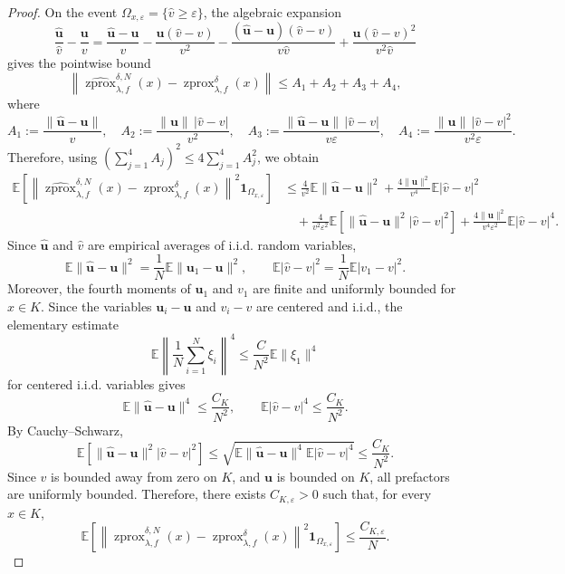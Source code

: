 \documentclass{article}
\newcommand{\zprox}{\ensuremath{\operatorname{zprox}}}
\newcommand{\szprox}{\ensuremath{\widehat{\operatorname{zprox}}}}
\begin{document}
\begin{proof}
On the event \(\Omega_{x,\varepsilon}=\{\hat v\ge \varepsilon\}\), the algebraic expansion
\[
\frac{\hat{\mathbf u}}{\hat v}-\frac{\mathbf u}{v}
=
\frac{\hat{\mathbf u}-\mathbf u}{v}
-
\frac{\mathbf u(\hat v-v)}{v^2}
-
\frac{(\hat{\mathbf u}-\mathbf u)(\hat v-v)}{v\hat v}
+
\frac{\mathbf u(\hat v-v)^2}{v^2\hat v}
\]
gives the pointwise bound
\[
\left\|
\szprox_{\lambda,f}^{\delta,N}(x)
-
\zprox_{\lambda,f}^{\delta}(x)
\right\|
\le A_1+A_2+A_3+A_4,
\]
where
\[
A_1:=\frac{\|\hat{\mathbf u}-\mathbf u\|}{v},
\quad
A_2:=\frac{\|\mathbf u\|\,|\hat v-v|}{v^2}, \quad A_3:=
\frac{\|\hat{\mathbf u}-\mathbf u\|\,|\hat v-v|}{v\varepsilon},
\quad
A_4:=
\frac{\|\mathbf u\|\,|\hat v-v|^2}{v^2\varepsilon}.
\]
Therefore, using \((\sum_{j=1}^4 A_j)^2\le 4\sum_{j=1}^4 A_j^2\), we obtain
\[
\begin{aligned}
\mathbb{E}\left[
\left\|
\szprox_{\lambda,f}^{\delta,N}(x)
-
\zprox_{\lambda,f}^{\delta}(x)
\right\|^2
\mathbf 1_{\Omega_{x,\varepsilon}}
\right] &\le
\frac{4}{v^2}\mathbb{E}\|\hat{\mathbf u}-\mathbf u\|^2
+
\frac{4\|\mathbf u\|^2}{v^4}\mathbb{E}|\hat v-v|^2 \\
&\quad+
\frac{4}{v^2\varepsilon^2}
\mathbb{E}\left[
\|\hat{\mathbf u}-\mathbf u\|^2|\hat v-v|^2
\right]
+
\frac{4\|\mathbf u\|^2}{v^4\varepsilon^2}
\mathbb{E}|\hat v-v|^4 .
\end{aligned}
\]
Since \(\hat{\mathbf u}\) and \(\hat v\) are empirical averages of i.i.d. random variables,
\[
\mathbb{E}\|\hat{\mathbf u}-\mathbf u\|^2
=
\frac{1}{N}\mathbb{E}\|\mathbf u_1-\mathbf u\|^2,
\qquad
\mathbb{E}|\hat v-v|^2
=
\frac{1}{N}\mathbb{E}|v_1-v|^2.
\]
Moreover, the fourth moments of \(\mathbf u_1\) and \(v_1\) are finite and uniformly bounded for \(x\in K\). Since the variables \(\mathbf u_i-\mathbf u\) and \(v_i-v\) are centered and i.i.d., the elementary estimate
\[
\mathbb{E}\left\|\frac1N\sum_{i=1}^N \xi_i\right\|^4
\le
\frac{C}{N^2}\mathbb{E}\|\xi_1\|^4
\]
for centered i.i.d. variables gives
\[
\mathbb{E}\|\hat{\mathbf u}-\mathbf u\|^4
\le
\frac{C_K}{N^2},
\qquad
\mathbb{E}|\hat v-v|^4
\le
\frac{C_K}{N^2}.
\]
By Cauchy--Schwarz,
\[
\mathbb{E}\left[
\|\hat{\mathbf u}-\mathbf u\|^2|\hat v-v|^2
\right]
\le
\sqrt{
\mathbb{E}\|\hat{\mathbf u}-\mathbf u\|^4
\mathbb{E}|\hat v-v|^4
}
\le
\frac{C_K}{N^2}.
\]
Since \(v\) is bounded away from zero on \(K\), and \(\mathbf u\) is bounded on \(K\), all prefactors are uniformly bounded. Therefore, there exists \(C_{K,\varepsilon}>0\) such that, for every \(x\in K\),
\[
\mathbb{E}\left[
\left\|
\szprox_{\lambda,f}^{\delta,N}(x)
-
\zprox_{\lambda,f}^{\delta}(x)
\right\|^2
\mathbf 1_{\Omega_{x,\varepsilon}}
\right]
\le
\frac{C_{K,\varepsilon}}{N}.
\]
\end{proof}
\end{document}
